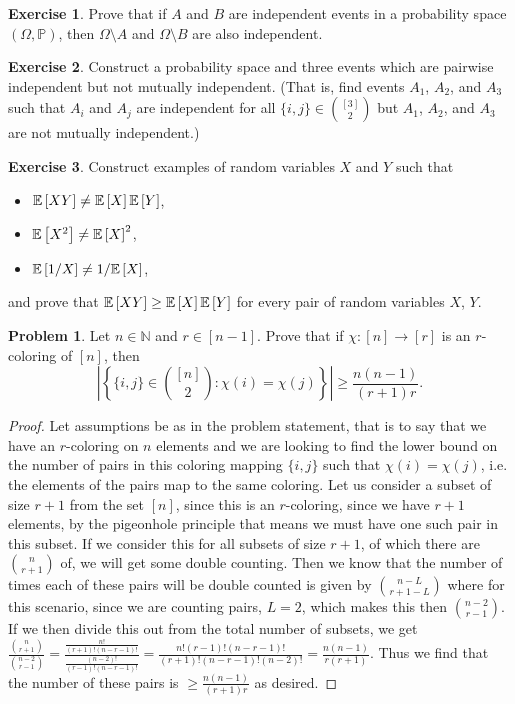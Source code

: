 \documentclass[11pt]{amsart}
\newcommand{\Expect}[1]{\ensuremath{%
    \mathbb E\left[#1\right]
  }}
\theoremstyle{definition}
\newtheorem{problem}{Problem}[]
\newtheorem{exercise}{Exercise}[]
\begin{document}
\begin{exercise}
  Prove that if $A$ and $B$ are independent events in a probability space $(\Omega, \mathbb P)$, then $\Omega\setminus A$ and $\Omega \setminus B$ are also independent.
\end{exercise}

\begin{exercise}
  Construct a probability space and three events which are pairwise independent but not mutually independent.  (That is, find events $A_1$, $A_2$, and $A_3$ such that $A_i$ and $A_j$ are independent for all $\{i, j\} \in \binom{[3]}{2}$ but $A_1$, $A_2$, and $A_3$ are not mutually independent.)
\end{exercise}

\begin{exercise}
  Construct examples of random variables $X$ and $Y$ such that
  \begin{itemize}
  \item $\Expect{XY} \neq \Expect{X}\Expect{Y}$,
  \item $\Expect{X^2} \neq \Expect{X}^2$,
  \item $\Expect{1/X} \neq 1 / \Expect{X}$,
  \end{itemize}
  and prove that $\Expect{XY} \geq \Expect{X}\Expect{Y}$ for every pair of random variables $X$, $Y$.
\end{exercise}
\clearpage

\begin{problem}
  Let $n \in \mathbb N$ and $r \in [n - 1]$.  Prove that if $\chi : [n] \rightarrow [r]$ is an $r$-coloring of $[n]$, then
  \begin{equation*}
    \left|\left\{\{i, j\} \in \binom{[n]}{2} : \chi(i) = \chi(j)\right\}\right| \geq  \frac{n(n - 1)}{(r + 1)r}. 
  \end{equation*}
\end{problem}

\begin{proof}
Let assumptions be as in the problem statement, that is to say that we have an $r$-coloring on $n$ elements and we are looking to find the lower bound on the number of pairs in this coloring mapping $\{i, j\}$ such that $\chi(i) = \chi(j)$, i.e. the elements of the pairs map to the same coloring. Let us consider a subset of size $r + 1$ from the set $[n]$, since this is an $r$-coloring, since we have $r + 1$ elements, by the pigeonhole principle that means we must have one such pair in this subset. If we consider this for all subsets of size $r + 1$, of which there are $\binom{n}{r+1}$ of, we will get some double counting. Then we know that the number of times each of these pairs will be double counted is given by $\binom{n-L}{r+1 - L}$ where for this scenario, since we are counting pairs, $L = 2$, which makes this then $\binom{n-2}{r-1}$. If we then divide this out from the total number of subsets, we get $\frac{\binom{n}{r+1}}{\binom{n-2}{r-1}} = \frac{\frac{n!}{(r+1)!(n-r-1)!}}{\frac{(n-2)!}{(r-1)!(n-r-1)!}} = \frac{n!(r - 1)!(n - r - 1)!}{(r+1)!(n - r - 1)!(n - 2)!} = \frac{n(n-1)}{r(r+1)}$. Thus we find that the number of these pairs is $\geq \frac{n(n - 1)}{(r + 1)r}$ as desired.
\end{proof}
\end{document}
